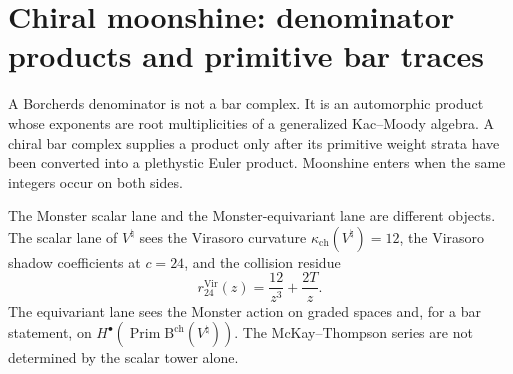 %

\providecommand{\cA}{\mathcal A}
\providecommand{\cB}{\mathcal B}
\providecommand{\cH}{\mathcal H}
\providecommand{\cM}{\mathcal M}
\providecommand{\cO}{\mathcal O}
\providecommand{\PhiFA}{\Phi^{\mathrm{FA}}}
\providecommand{\SpCh}{\mathrm{Sp}^{\mathrm{ch}}}
\providecommand{\cT}{\mathcal T}
\providecommand{\bZ}{\mathbb Z}
\providecommand{\bQ}{\mathbb Q}
\providecommand{\bH}{\mathbb H}
\providecommand{\bM}{\mathbb M}
\providecommand{\Aut}{\operatorname{Aut}}
\providecommand{\Tr}{\operatorname{Tr}}
\providecommand{\Str}{\operatorname{Str}}
\providecommand{\sdim}{\operatorname{sdim}}
\providecommand{\PE}{\operatorname{PE}}
\providecommand{\Co}{\mathrm{Co}}
\providecommand{\Th}{\mathrm{Th}}
\providecommand{\Mtw}{M_{24}}
\providecommand{\Vnat}{V^{\natural}}
\providecommand{\Vsnat}{V^{s\natural}}
\providecommand{\VTh}{V^{\Th}}
\providecommand{\VKthree}{V_{K3}^{\cN{=}4}}
\providecommand{\cN}{\mathcal N}
\providecommand{\Barch}{\mathrm B^{\mathrm{ch}}}
\providecommand{\BarchOrd}{\mathrm B^{\mathrm{ch},\mathrm{ord}}}
\providecommand{\kapch}{\kappa_{\mathrm{ch}}}
\providecommand{\kapBKM}{\kappa_{\mathrm{BKM}}}
\providecommand{\kapcat}{\kappa_{\mathrm{cat}}}
\providecommand{\kapfiber}{\kappa_{\mathrm{fiber}}}
\providecommand{\ZcSig}{Z^{\mathrm{der}}_{\mathrm{ch}}}
\providecommand{\ChirHoch}{\mathrm{ChirHoch}}

\chapter{Chiral moonshine: denominator products and primitive bar traces}
\label{chap:chiral-moonshine-unified}

\noindent
A Borcherds denominator is not a bar complex.  It is an automorphic
product whose exponents are root multiplicities of a generalized
Kac--Moody algebra.  A chiral bar complex supplies a product only
after its primitive weight strata have been converted into a
plethystic Euler product.  Moonshine enters when the same integers
occur on both sides.

The Monster scalar lane and the Monster-equivariant lane are different
objects.  The scalar lane of $\Vnat$ sees the Virasoro curvature
$\kapch(\Vnat)=12$, the Virasoro shadow coefficients at $c=24$, and
the collision residue
\[
 r^{\mathrm{Vir}}_{24}(z)=\frac{12}{z^3}+\frac{2T}{z}.
\]
The equivariant lane sees the Monster action on graded spaces and, for
a bar statement, on
$H^\bullet(\operatorname{Prim}\Barch(\Vnat))$.  The McKay--Thompson
series are not determined by the scalar tower alone.

